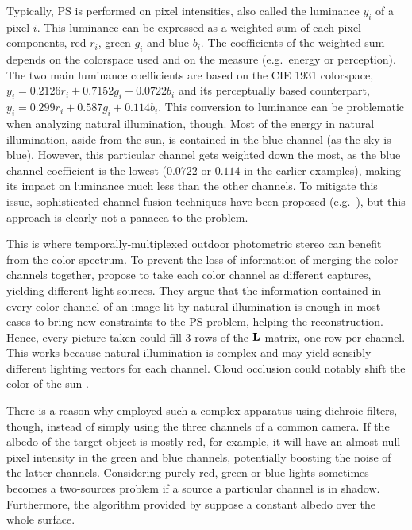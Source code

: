 \documentclass{report}
\begin{document}
Typically, PS is performed on pixel intensities, also called the luminance $y_i$ of a pixel $i$. This luminance can be expressed as a weighted sum of each pixel components, red $r_i$, green $g_i$ and blue $b_i$. The coefficients of the weighted sum depends on the colorspace used and on the measure (e.g.\ energy or perception). The two main luminance coefficients are based on the CIE 1931 colorspace, $y_i = 0.2126r_i + 0.7152g_i + 0.0722b_i$ and its perceptually based counterpart, $y_i = 0.299r_i + 0.587g_i + 0.114b_i$. This conversion to luminance can be problematic when analyzing natural illumination, though. Most of the energy in natural illumination, aside from the sun, is contained in the blue channel (as the sky is blue). However, this particular channel gets weighted down the most, as the blue channel coefficient is the lowest ($0.0722$ or $0.114$ in the earlier examples), making its impact on luminance much less than the other channels. To mitigate this issue, sophisticated channel fusion techniques have been proposed (e.g.\ \cite{jung-cvpr-15}), but this approach is clearly not a panacea to the problem.

This is where temporally-multiplexed outdoor photometric stereo can benefit from the color spectrum. To prevent the loss of information of merging the color channels together, \cite{johnson-cvpr-11} propose to take each color channel as different captures, yielding different light sources. They argue that the information contained in every color channel of an image lit by natural illumination is enough in most cases to bring new constraints to the PS problem, helping the reconstruction. Hence, every picture taken could fill 3 rows of the $\mathbf{L}$ matrix, one row per channel. This works because natural illumination is complex and may yield sensibly different lighting vectors for each channel. Cloud occlusion could notably shift the color of the sun .

There is a reason why \cite{Fyffe2011} employed such a complex apparatus using dichroic filters, though, instead of simply using the three channels of a common camera. If the albedo of the target object is mostly red, for example, it will have an almost null pixel intensity in the green and blue channels, potentially boosting the noise of the latter channels.  Considering purely red, green or blue lights sometimes becomes a two-sources problem if a source a particular channel is in shadow. Furthermore, the algorithm provided by \cite{johnson-cvpr-11} suppose a constant albedo over the whole surface.
\end{document}
